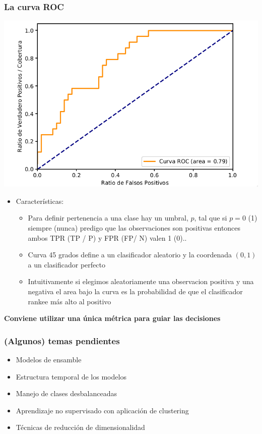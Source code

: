 \documentclass[leqno, 10pt, envcountsect]{beamer}
\numberwithin{equation}{section}
\theoremstyle{definition}
\theoremstyle{example}
\numberwithin{figure}{section}
\numberwithin{table}{section}
\let\olditem\item
\renewcommand{\item}{%
\olditem\vspace{1pt}}
\begin{document}
\begin{frame}
  \frametitle{La curva ROC}
  \begin{center}
    \includegraphics[scale=0.2]{roc.png}
  \end{center}
  \begin{itemize}
    \item Características:
      \begin{itemize}
        \item Para definir pertenencia a una clase hay un umbral, $p$, tal que
          si $p=0$ (1) siempre (nunca) predigo que las observaciones son
          positivas entonces ambos TPR (TP / P) y FPR (FP/ N) valen 1 (0)..
        \item Curva 45 grados define a un clasificador aleatorio y la
          coordenada $(0,1)$ a un clasificador perfecto
        \item Intuitivamente si elegimos aleatoriamente una observacion
          positiva y una negativa el area bajo la curva es la probabilidad de
          que el clasificador rankee más alto al positivo
      \end{itemize}
  \end{itemize}

  \textbf{Conviene utilizar una única métrica para guiar las decisiones}
\end{frame}
\begin{frame}
  \frametitle{(Algunos) temas pendientes}
  \begin{itemize}
    \item Modelos de ensamble
    \item Estructura temporal de los modelos
    \item Manejo de clases desbalanceadas
    \item Aprendizaje no supervisado con aplicación de clustering
    \item Técnicas de reducción de dimensionalidad
  \end{itemize}

\end{frame}
\end{document}
